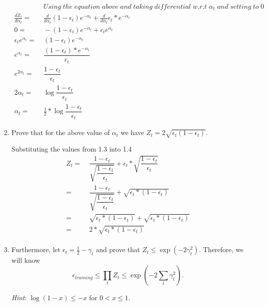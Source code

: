 \documentclass[english]{article}
\begin{document}
\begin{enumerate}
\begin{align*}
	&\; Using \; the \; equation \; above \; and \; taking \; differential \; w.r.t \; \alpha_t  \; and \; setting \; to \; 0\\
	\frac{d{Z_t}}{d{\alpha_t}} = &\; \frac{d}{d{\alpha_t}} (1 - \epsilon_t) e^{-\alpha_t} + \frac{d}{d{\alpha_t}} \epsilon_t * e^{-\alpha_t} \\
	 0 =&\; - (1 - \epsilon_t) e^{-\alpha_t} + \epsilon_t e^{\alpha_t} \\
	 \epsilon_t e^{\alpha_t} =&\; (1 - \epsilon_t) e^{-\alpha_t} \\
	e^{\alpha_t} =&\; \dfrac{(1 - \epsilon_t) * e ^ {-\alpha_t}} {\epsilon_t} \\
	e^{2 \alpha_t} =&\; \dfrac{1-\epsilon_t}{\epsilon_t} \\
	2 \alpha_t =&\; \log {\dfrac{1-\epsilon_t}{\epsilon_t}} \\
	\alpha_t =&\; \frac{1}{2} * \log {\dfrac{1-\epsilon_t}{\epsilon_t}}
\end{align*}

\item Prove that for the above value of $\alpha_t$ we
  have $Z_t = 2\sqrt{\epsilon_t(1-\epsilon_t)}$.

Substituting the values from 1.3 into 1.4 \\
\begin{align*}
	Z_t = &\; \dfrac{1 - \epsilon_t}{ \sqrt{\dfrac{1 - \epsilon_t}{\epsilon_t}}} + \epsilon_t * \sqrt {\dfrac {1 - \epsilon_t}{\epsilon_t} } \\
	=&\; \dfrac{1 - \epsilon_t} {\sqrt {\dfrac{1 - \epsilon_t} {\epsilon_t}} } + \sqrt {\epsilon_t * (1 - \epsilon_t)} \\
	=&\; \sqrt {\epsilon_t * (1 - \epsilon_t)} + \sqrt {\epsilon_t * (1 - \epsilon_t)} \\
	=&\; 2 * \sqrt {\epsilon_t * (1 - \epsilon_t)} \\
\end{align*}


\item Furthermore, let $\epsilon_t=\frac{1}{2}-\gamma_t$
  and prove that $Z_t\leq \exp(-2\gamma_t^2)$.  Therefore, we will
  know
  \begin{equation*}
    \epsilon_{training} \le \prod_tZ_t \le
    \exp(-2\sum_t\gamma_t^2).
  \end{equation*}

  {\em Hint}: $\log(1-x)\leq -x$ for $0<x\leq 1$.


\end{enumerate}
\end{document}
